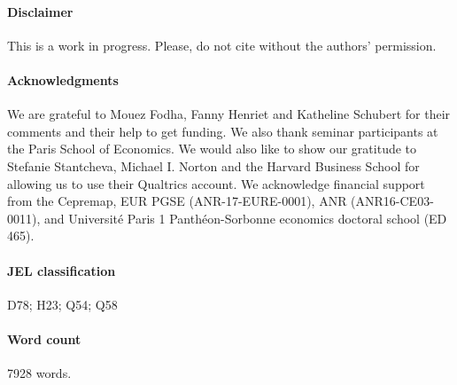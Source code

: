 \documentclass[english,5p,authoryear]{elsarticle}
\begin{document}





\paragraph*{\textbf{Disclaimer}} This is a work in progress. Please, do not cite without the authors' permission. %

\paragraph*{Acknowledgments} We are grateful to Mouez Fodha, Fanny Henriet and Katheline Schubert for their comments and their help to get funding. We also thank seminar participants at the Paris School of Economics. We would also like to show our gratitude to Stefanie Stantcheva, Michael I. Norton and the Harvard Business School for allowing us to use their Qualtrics account. We acknowledge financial support from the Cepremap, EUR PGSE (ANR-17-EURE-0001), ANR (ANR16-CE03-0011), and Université Paris 1 Panthéon-Sorbonne economics doctoral school (ED 465).

\paragraph*{JEL classification} D78; H23; Q54; Q58

\paragraph{Word count} 7928 words.


\end{document}
